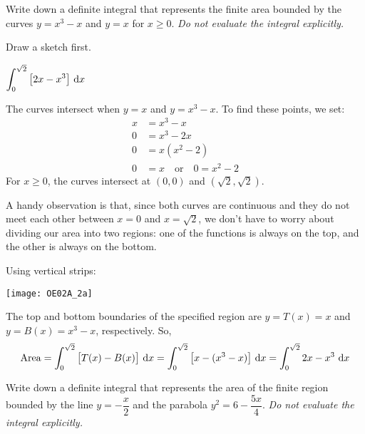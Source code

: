 \begin{solution}
\begin{enumerate}[(a)]
\end{enumerate}
\end{solution}


\begin{Mquestion}[M121 2002A]
Write down a definite integral that represents the
finite area bounded by the curves $y=x^3-x$ and
$y=x$ for $x\ge 0$.
\emph{Do not evaluate the integral explicitly.}
\end{Mquestion}

\begin{hint}
Draw a sketch first.
\end{hint}

\begin{answer}
$ \displaystyle\int_0^{\sqrt{2}}\big[2x-x^3\big]\ \dee{x}$
\end{answer}

\begin{solution}
The curves intersect when $y=x$ and $y=x^3-x$. To find these points, we set:
\begin{align*}
x&=x^3-x\\
0&=x^3-2x\\
0&=x(x^2-2)\\
0&= x \quad\mbox{or}\quad 0=x^2-2
\end{align*}
For $x\ge 0$, the curves intersect at $(0,0)$ and $(\sqrt{2},\sqrt{2})$.

A handy observation is that, since both curves are continuous and they do not meet each other between $x=0$ and $x=\sqrt{2}$, we don't have to worry about dividing our area into two regions: one of the functions is always on the top, and the other is always on the bottom.

Using vertical strips:
\begin{center}
       \texttt{[image: OE02A\_2a]}
\end{center}
The top and bottom boundaries of the specified region are $y=T(x)=x$
and $y=B(x)=x^3-x$, respectively. So,
\begin{align*}
{\rm Area} = \int_0^{\sqrt{2}}\big[T(x)-B(x)\big]\ \mathrm{d}x
= \int_0^{\sqrt{2}}\big[x-(x^3-x)\big]\ \mathrm{d}x = \int_0^{\sqrt{2}} 2x-x^3 \ \mathrm{d}x
\end{align*}

\end{solution}


\begin{question}[2000D]
Write down a definite integral that represents the
area of the finite region bounded by the line $y=-\dfrac{x}{2}$
and the parabola $y^2=6-\dfrac{5x}{4}$.
\emph{Do not evaluate the integral explicitly.}
\end{question}


